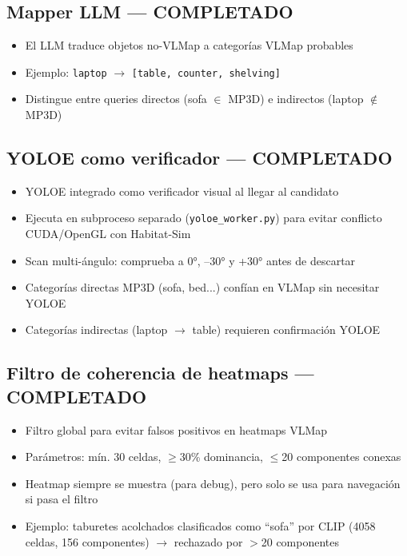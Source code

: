 \documentclass[11pt,a4paper]{article}
\begin{document}
\subsection{Mapper LLM --- COMPLETADO}

\begin{itemize}[leftmargin=2cm]
    \item[\textcolor{done}{$\checkmark$}] El LLM traduce objetos no-VLMap a categorías VLMap probables
    \item[\textcolor{done}{$\checkmark$}] Ejemplo: \texttt{laptop} $\rightarrow$ \texttt{[table, counter, shelving]}
    \item[\textcolor{done}{$\checkmark$}] Distingue entre queries directos (sofa $\in$ MP3D) e indirectos (laptop $\notin$ MP3D)
\end{itemize}

\subsection{YOLOE como verificador --- COMPLETADO}

\begin{itemize}[leftmargin=2cm]
    \item[\textcolor{done}{$\checkmark$}] YOLOE integrado como verificador visual al llegar al candidato
    \item[\textcolor{done}{$\checkmark$}] Ejecuta en subproceso separado (\texttt{yoloe\_worker.py}) para evitar conflicto CUDA/OpenGL con Habitat-Sim
    \item[\textcolor{done}{$\checkmark$}] Scan multi-ángulo: comprueba a 0°, --30° y +30° antes de descartar
    \item[\textcolor{done}{$\checkmark$}] Categorías directas MP3D (sofa, bed...) confían en VLMap sin necesitar YOLOE
    \item[\textcolor{done}{$\checkmark$}] Categorías indirectas (laptop $\rightarrow$ table) requieren confirmación YOLOE
\end{itemize}

\subsection{Filtro de coherencia de heatmaps --- COMPLETADO}

\begin{itemize}[leftmargin=2cm]
    \item[\textcolor{done}{$\checkmark$}] Filtro global para evitar falsos positivos en heatmaps VLMap
    \item[\textcolor{done}{$\checkmark$}] Parámetros: mín. 30 celdas, $\geq$30\% dominancia, $\leq$20 componentes conexas
    \item[\textcolor{done}{$\checkmark$}] Heatmap siempre se muestra (para debug), pero solo se usa para navegación si pasa el filtro
    \item[\textcolor{done}{$\checkmark$}] Ejemplo: taburetes acolchados clasificados como ``sofa'' por CLIP (4058 celdas, 156 componentes) $\rightarrow$ rechazado por $>$20 componentes
\end{itemize}
\end{document}
